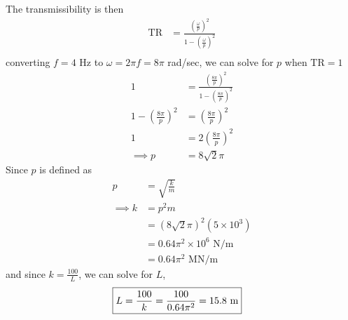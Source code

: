 The transmissibility is then
\begin{align*}
    \text{TR} &= \frac{\left(\frac{\omega}{p}\right)^2}{1 - \left(\frac{\omega}{p}\right)^2} \\
\end{align*}
converting $f = 4$ Hz to $\omega = 2\pi f = 8\pi$ rad/sec, we can solve for $p$ when $\text{TR} = 1$
\begin{align*}
    1 &= \frac{\left(\frac{8\pi}{p}\right)^2}{1 - \left(\frac{8\pi}{p}\right)^2} \\
    1 - \left(\frac{8\pi}{p}\right)^2 &= \left(\frac{8\pi}{p}\right)^2 \\
    1 &= 2\left(\frac{8\pi}{p}\right)^2 \\
    \implies p &= 8\sqrt{2} \pi
\end{align*}
Since $p$ is defined as 
\begin{align*}
    p &= \sqrt{\frac{k}{m}}\\
    \implies k &= p^2m \\
    &= (8\sqrt{2}\pi)^2 (5 \times 10^3) \\
    &= 0.64\pi^2 \times 10^6 \text{ N/m} \\
    &= 0.64\pi^2 \text{ MN/m}
\end{align*}
and since $k = \frac{100}{L}$, we can solve for $L$,
\begin{align*}
    \Aboxed{L &= \frac{100}{k} = \frac{100}{0.64\pi^2} = 15.8 \text{ m}}
\end{align*}

